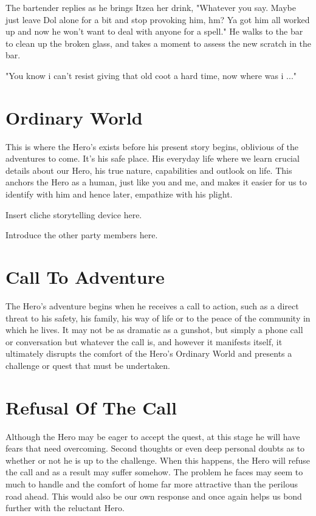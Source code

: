 \documentclass[oneside]{book}
\begin{document}
The bartender replies as he brings Itzea her drink, "Whatever you say. Maybe just leave Dol alone for a bit and stop provoking him, hm? Ya got him all worked up and now he won't want to deal with anyone for a spell." He walks to the bar to clean up the broken glass, and takes a moment to assess the new scratch in the bar. 

"You know i can't resist giving that old coot a hard time, now where was i ..." 



\newpage

\chapter{Ordinary World}

This is where the Hero's exists before his present story begins, oblivious of the adventures to come. It's his safe place. His everyday life where we learn crucial details about our Hero, his true nature, capabilities and outlook on life. This anchors the Hero as a human, just like you and me, and makes it easier for us to identify with him and hence later, empathize with his plight.

Insert cliche storytelling device here. 

Introduce the other party members here. 



\newpage

\chapter {Call To Adventure}

The Hero's adventure begins when he receives a call to action, such as a direct threat to his safety, his family, his way of life or to the peace of the community in which he lives. It may not be as dramatic as a gunshot, but simply a phone call or conversation but whatever the call is, and however it manifests itself, it ultimately disrupts the comfort of the Hero's Ordinary World and presents a challenge or quest that must be undertaken.



\newpage

\chapter{Refusal Of The Call}

Although the Hero may be eager to accept the quest, at this stage he will have fears that need overcoming. Second thoughts or even deep personal doubts as to whether or not he is up to the challenge. When this happens, the Hero will refuse the call and as a result may suffer somehow. The problem he faces may seem to much to handle and the comfort of home far more attractive than the perilous road ahead. This would also be our own response and once again helps us bond further with the reluctant Hero.
\end{document}
